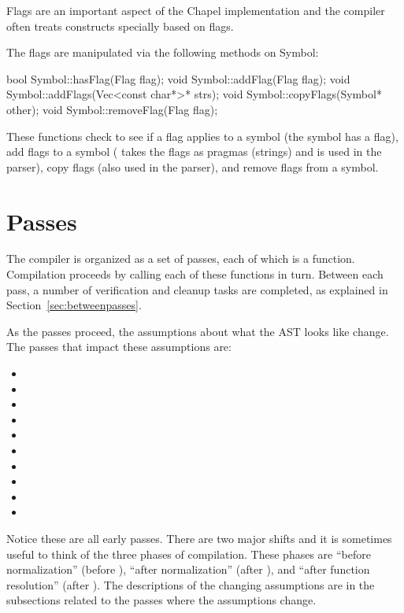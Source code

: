 \documentclass[10pt]{article}
\begin{document}
Flags are an important aspect of the Chapel implementation and the
compiler often treats constructs specially based on flags.

The flags are manipulated via the following methods on Symbol:
\begin{clang}
bool Symbol::hasFlag(Flag flag);
void Symbol::addFlag(Flag flag);
void Symbol::addFlags(Vec<const char*>* strs);
void Symbol::copyFlags(Symbol* other);
void Symbol::removeFlag(Flag flag);
\end{clang}
These functions check to see if a flag applies to a symbol (the symbol
has a flag), add flags to a symbol ( takes the flags as
pragmas (strings) and is used in the parser), copy flags (also used in
the parser), and remove flags from a symbol.

\section{Passes}
\label{sec:passes}

The compiler is organized as a set of passes, each of which is a
function.  Compilation proceeds by calling each of these functions in
turn.  Between each pass, a number of verification and cleanup tasks
are completed, as explained in Section~\ref{sec:betweenpasses}.

As the passes proceed, the assumptions about what the AST looks like
change.  The passes that impact these assumptions are:
\begin{itemize}
\item {}
\item {}
\item {}
\item {}
\item {}
\item {}
\item {}
\item {}
\item {}
\item {}
\end{itemize}
Notice these are all early passes.  There are two major shifts and it
is sometimes useful to think of the three phases of compilation.
These phases are ``before normalization'' (before ),
``after normalization'' (after ), and ``after function
resolution'' (after ).  The descriptions of the changing
assumptions are in the subsections related to the passes where the
assumptions change.
\end{document}
